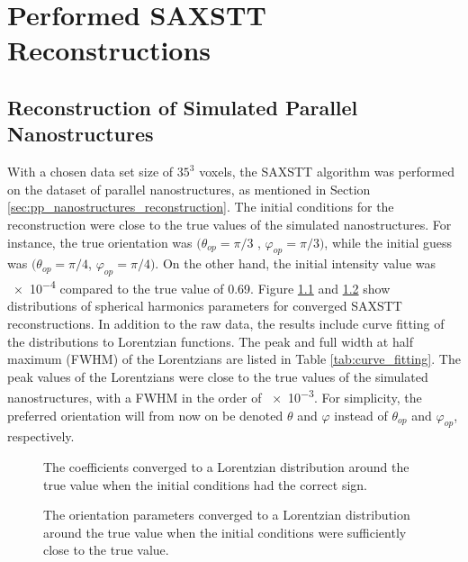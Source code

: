 \chapter{Performed SAXSTT Reconstructions}

\section{Reconstruction of Simulated Parallel Nanostructures}
\label{sec:reconstruction_parallel}

With a chosen data set size of $35^3$ voxels,
the SAXSTT algorithm was performed on the dataset of parallel nanostructures, as mentioned in Section \ref{sec:pp_nanostructures_reconstruction}.
The initial conditions for the reconstruction were close to the true values of the simulated nanostructures.
For instance, the true orientation was $(\theta_{op} = \pi/3$ , $\varphi_{op} = \pi/3)$, while the initial guess was $(\theta_{op} = \pi/4$, $\varphi_{op} = \pi/4)$.
On the other hand, the initial intensity value was \num{e-4} compared to the true value of 0.69.
Figure \ref{fig:coefficient_comparison_AD_SYM} and \ref{fig:orientation_comparison_AD_SYM} show distributions of spherical harmonics parameters for converged SAXSTT reconstructions.
In addition to the raw data, the results include curve fitting of the distributions to Lorentzian functions.
The peak and full width at half maximum (FWHM) of the Lorentzians are listed in Table \ref{tab:curve_fitting}.
The peak values of the Lorentzians were close to the true values of the simulated nanostructures, with a FWHM in the order of \num{e-3}.
For simplicity, the preferred orientation will from now on be denoted $\theta$ and $\varphi$ instead of $\theta_{op}$ and $\varphi_{op}$, respectively.

\begin{figure}[h!]
    \centering
    
    \caption[Distribution of Reconstructed Coefficients]{ The coefficients converged to a Lorentzian distribution
        around the true value when the initial conditions had the correct sign.  }
    \label{fig:coefficient_comparison_AD_SYM}
\end{figure}

\begin{figure}[h!]
    \centering
    
    \caption[Distribution of Reconstructed Orientation]{  The orientation parameters converged to a Lorentzian distribution
        around the true value when the initial conditions were sufficiently close to the true value.}
    \label{fig:orientation_comparison_AD_SYM}
\end{figure}


